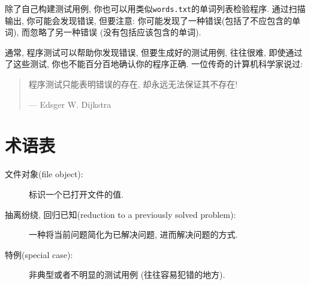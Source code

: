 \documentclass[10pt]{book}
\begin{document}
除了自己构建测试用例, 你也可以用类似{\tt words.txt}的单词列表检验程序. 
通过扫描输出, 你可能会发现错误, 但要注意: 
你可能发现了一种错误(包括了不应包含的单词), 而忽略了另一种错误
(没有包括应该包含的单词). 

通常, 程序测试可以帮助你发现错误, 但要生成好的测试用例, 
往往很难, 即使通过了这些测试, 你也不能百分百地确认你的程序正确. 
一位传奇的计算机科学家说过:

\begin{quote}

程序测试只能表明错误的存在, 却永远无法保证其不存在!

--- Edsger W. Dijkstra
\end{quote}

\section{术语表}

\begin{description}

\item[文件对象(file object):] 标识一个已打开文件的值.


\item[抽离纷绕, 回归已知(reduction to a previously solved problem):] 一种将当前问题简化为已解决问题, 进而解决问题的方式.


\item[特例(special case):] 非典型或者不明显的测试用例
(往往容易犯错的地方).

\end{description}
\end{document}
